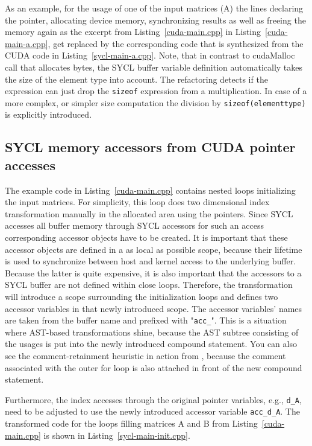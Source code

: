 \documentclass[sigconf]{acmart}
\newcommand{\inputcode}[2]{}
\newcommand{\inputsycl}[2]{}
\newcommand{\tcode}[1]{\texttt{#1}}
\begin{document}
As an example, for the usage of one of the input matrices (A) the lines declaring the pointer, allocating device memory, synchronizing results as well as freeing the memory again as the excerpt from Listing~\ref{cuda-main.cpp} in Listing~\ref{cuda-main-a.cpp}, get replaced by the corresponding code that is synthesized from the CUDA code in Listing~\ref{sycl-main-a.cpp}. Note, that in contrast to cudaMalloc call that allocates bytes, the SYCL buffer variable definition automatically takes the size of the element type into account. The refactoring detects if the expression can just drop the \tcode{sizeof} expression from a multiplication. In case of a more complex, or simpler size computation the division by \tcode{sizeof(elementtype)} is explicitly introduced.

\inputcode{cuda-main-a.cpp}{Setting up and cleaning up CUDA input data.}
\inputsycl{sycl-main-a.cpp}{SYCL buffer declaration replaces all lines in Listing~\ref{cuda-main-a.cpp}}

\subsection{SYCL memory accessors from CUDA pointer accesses}
The example code in Listing~\ref{cuda-main.cpp} contains nested loops initializing the input matrices. For simplicity, this loop does two dimensional index transformation manually in the allocated area using the pointers. 
Since SYCL accesses all buffer memory through SYCL accessors for such an access corresponding accessor objects have to be created. 
It is important that these accessor objects are defined in a as local as possible scope, because their lifetime is used to synchronize between host and kernel access to the underlying buffer. 
Because the latter is quite expensive, it is also important that the accessors to a SYCL buffer are not defined within close loops. 
Therefore, the transformation will introduce a scope surrounding the initialization loops and defines two accessor variables in that newly introduced scope. The accessor variables' names are taken from the buffer name and prefixed with "\tcode{acc_}". 
This is a situation where AST-based transformations shine, because the AST subtree consisting of the usages is put into the newly introduced compound statement. 
You can also see the comment-retainment heuristic in action from \cite{Sommerlad2008}, because the comment associated with the outer for loop is also attached in front of the new compound statement.

Furthermore, the index accesses through the original pointer variables, e.g., \tcode{d_A}, need to be adjusted to use the newly introduced accessor variable \tcode{acc_d_A}. The transformed code for the loops filling matrices A and B from Listing~\ref{cuda-main.cpp} is shown in Listing~\ref{sycl-main-init.cpp}.
\inputsycl{sycl-main-init.cpp}{Introducing scope for SYCL accessors}
\end{document}
